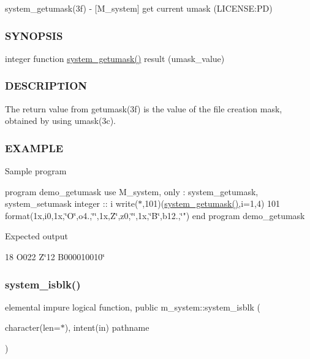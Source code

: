 system\+\_\+getumask(3f) -\/ \mbox{[}M\+\_\+system\mbox{]} get current umask (L\+I\+C\+E\+N\+SE\+:PD) \subsubsection*{S\+Y\+N\+O\+P\+S\+IS}

integer function \mbox{\hyperlink{namespacem__system_aa9ca951be39d2ea738d627cf42c00ddd}{system\+\_\+getumask()}} result (umask\+\_\+value) \subsubsection*{D\+E\+S\+C\+R\+I\+P\+T\+I\+ON}

The return value from getumask(3f) is the value of the file creation mask, obtained by using umask(3c). \subsubsection*{E\+X\+A\+M\+P\+LE}

Sample program

program demo\+\_\+getumask use M\+\_\+system, only \+: system\+\_\+getumask, system\+\_\+setumask integer \+:\+: i write($\ast$,101)(\mbox{\hyperlink{namespacem__system_aa9ca951be39d2ea738d627cf42c00ddd}{system\+\_\+getumask()}},i=1,4) 101 format(1x,i0,1x,\char`\"{}\+O\textquotesingle{}\char`\"{},o4.,\char`\"{}\textquotesingle{}\char`\"{},1x,\textquotesingle{}Z\char`\"{}\textquotesingle{},z0,\char`\"{}\textquotesingle{}\char`\"{},1x,\char`\"{}B\textquotesingle{}\char`\"{},b12.,\char`\"{}\textquotesingle{}") end program demo\+\_\+getumask

Expected output

18 O\textquotesingle{}022\textquotesingle{} Z\char`\"{}12\textquotesingle{} B\textquotesingle{}000010010\char`\"{} \mbox{\label{namespacem__system_a1294b8d8b4910261c0a0991bf668ab67}} 
\subsubsection{\texorpdfstring{system\+\_\+isblk()}{system\_isblk()}}
{\footnotesize\ttfamily elemental impure logical function, public m\+\_\+system\+::system\+\_\+isblk (\begin{DoxyParamCaption}\item[{character(len=$\ast$), intent(in)}]{pathname }\end{DoxyParamCaption})}



